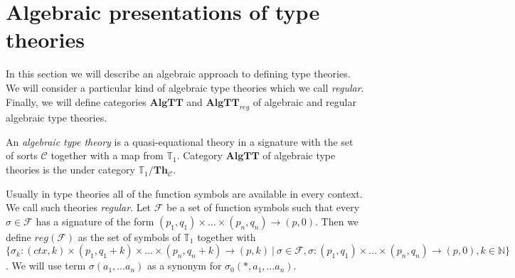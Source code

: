 \documentclass[reqno]{amsart}
\theoremstyle{definition}
\theoremstyle{remark}
\newcommand{\cat}[1]{\mathbf{#1}}
\newcommand{\algtt}{\cat{AlgTT}}
\numberwithin{figure}{section}
\begin{document}
\section{Algebraic presentations of type theories}

In this section we will describe an algebraic approach to defining type theories.
We will consider a particular kind of algebraic type theories which we call \emph{regular}.
Finally, we will define categories $\algtt$ and $\algtt_{reg}$ of algebraic and regular algebraic type theories.

\begin{defn}
An \emph{algebraic type theory} is a quasi-equational theory in a signature with the set of sorts $\mathcal{C}$ together with a map from $\mathbb{T}_1$.
Category $\algtt$ of algebraic type theories is the under category $\mathbb{T}_1 / \cat{Th}_\mathcal{C}$.
\end{defn}

Usually in type theories all of the function symbols are available in every context.
We call such theories \emph{regular}.
Let $\mathcal{F}$ be a set of function symbols such that every $\sigma \in \mathcal{F}$ has a signature of the form $(p_1,q_1) \times \ldots \times (p_n,q_n) \to (p,0)$.
Then we define $reg(\mathcal{F})$ as the set of symbols of $\mathbb{T}_1$ together with $\{ \sigma_k : (ctx, k) \times (p_1, q_1 + k) \times \ldots \times (p_n, q_n + k) \to (p, k) \ |\ \sigma \in \mathcal{F}, \sigma : (p_1,q_1) \times \ldots \times (p_n,q_n) \to (p,0), k \in \mathbb{N} \}$.
We will use term $\sigma(a_1, \ldots a_n)$ as a synonym for $\sigma_0(*, a_1, \ldots a_n)$.
\end{document}
